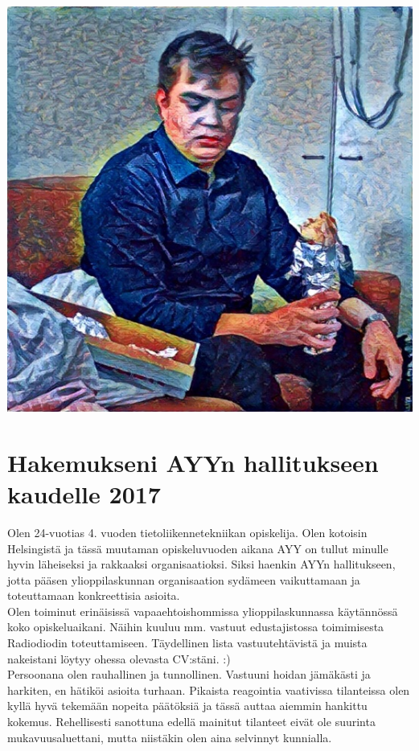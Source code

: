 \documentclass[a4paper, 12pt, finnish]{report}
\newcommand{\topic}{Hakemukseni AYYn hallitukseen kaudelle 2017}
\begin{document}
\includegraphics{Onni.jpg}
\section*{\topic}

Olen 24-vuotias 4. vuoden tietoliikennetekniikan opiskelija.
Olen kotoisin Helsingistä ja tässä muutaman opiskeluvuoden aikana AYY on tullut minulle hyvin läheiseksi ja rakkaaksi organisaatioksi.
Siksi haenkin AYYn hallitukseen, jotta pääsen ylioppilaskunnan organisaation sydämeen vaikuttamaan ja toteuttamaan konkreettisia asioita.\\


Olen toiminut erinäisissä vapaaehtoishommissa ylioppilaskunnassa käytännössä koko opiskeluaikani.
Näihin kuuluu mm. vastuut edustajistossa toimimisesta Radiodiodin toteuttamiseen.
Täydellinen lista vastuutehtävistä ja muista nakeistani löytyy ohessa olevasta CV:stäni. :)\\

Persoonana olen rauhallinen ja tunnollinen.
Vastuuni hoidan jämäkästi ja harkiten, en hätiköi asioita turhaan.
Pikaista reagointia vaativissa tilanteissa olen kyllä hyvä tekemään nopeita päätöksiä ja tässä auttaa aiemmin hankittu kokemus.
Rehellisesti sanottuna edellä mainitut tilanteet eivät ole suurinta mukavuusaluettani, mutta niistäkin olen aina selvinnyt kunnialla.\\
\end{document}
